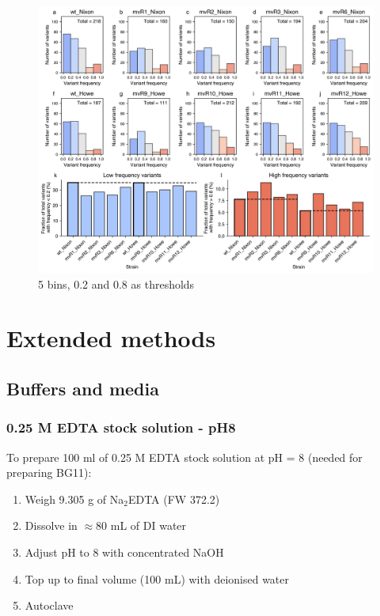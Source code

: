 \documentclass[12pt]{article}
\begin{document}
\begin{figure}[H]
    \centering
    \includegraphics[width=\hsize]{../Figures/WGS/variant_frequency_fraction_comparison_5bins.png}
    \caption{5 bins, 0.2 and 0.8 as thresholds}
    \label{fig:5bins}
\end{figure}



\section{Extended methods}

\subsection{Buffers and media}

\subsubsection{0.25 M EDTA stock solution - pH8}
To prepare 100 ml of 0.25 M EDTA stock solution at pH = 8 (needed for preparing BG11):
\begin{enumerate}
	\item Weigh 9.305 g of Na$_2$EDTA (FW 372.2)
	\item Dissolve in $\approx$80 mL of DI water
	\item Adjust pH to 8 with concentrated NaOH
	\item Top up to final volume (100 mL) with deionised water
	\item Autoclave
\end{enumerate}
\end{document}
